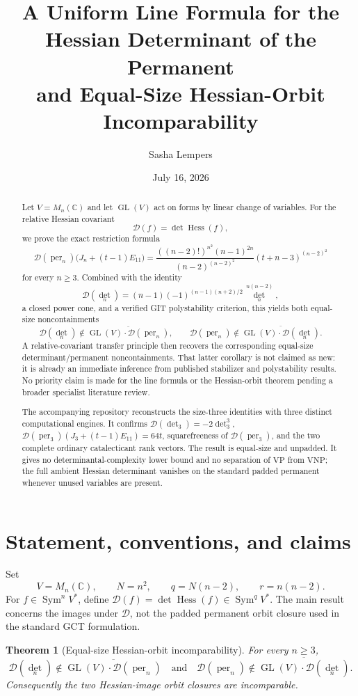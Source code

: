 \documentclass[11pt]{article}
\title{A Uniform Line Formula for the Hessian Determinant of the Permanent\\
and Equal-Size Hessian-Orbit Incomparability}
\author{Sasha Lempers}
\date{July 16, 2026}
\newtheorem{theorem}{Theorem}[section]
\theoremstyle{remark}
\DeclareMathOperator{\Hess}{Hess}
\DeclareMathOperator{\per}{per}
\DeclareMathOperator{\Sym}{Sym}
\DeclareMathOperator{\GL}{GL}
\newcommand{\C}{\mathbb C}
\newcommand{\Dcal}{\mathcal D}
\begin{document}
\maketitle

\begin{abstract}
Let $V=M_n(\C)$ and let $\GL(V)$ act on forms by linear change of variables.  For the relative Hessian covariant
\[
 \Dcal(f)=\det\Hess(f),
\]
we prove the exact restriction formula
\[
 \Dcal(\per_n)\bigl(J_n+(t-1)E_{11}\bigr)
 =\frac{((n-2)!)^{n^2}(n-1)^{2n}}{(n-2)^{(n-2)^2}}
   (t+n-3)^{(n-2)^2}
\]
for every $n\geq3$.  Combined with the identity
\[
 \Dcal(\det_n)
 =(n-1)(-1)^{(n-1)(n+2)/2}\det_n^{\,n(n-2)},
\]
a closed power cone, and a verified GIT polystability criterion, this yields both equal-size noncontainments
\[
 \Dcal(\det_n)\notin\overline{\GL(V)\cdot\Dcal(\per_n)},
 \qquad
 \Dcal(\per_n)\notin\overline{\GL(V)\cdot\Dcal(\det_n)}.
\]
A relative-covariant transfer principle then recovers the corresponding equal-size determinant/permanent noncontainments.  That latter corollary is not claimed as new: it is already an immediate inference from published stabilizer and polystability results.  No priority claim is made for the line formula or the Hessian-orbit theorem pending a broader specialist literature review.

The accompanying repository reconstructs the size-three identities with three distinct computational engines.  It confirms $\Dcal(\det_3)=-2\det_3^3$, $\Dcal(\per_3)(J_3+(t-1)E_{11})=64t$, squarefreeness of $\Dcal(\per_3)$, and the two complete ordinary catalecticant rank vectors.  The result is equal-size and unpadded.  It gives no determinantal-complexity lower bound and no separation of $\mathrm{VP}$ from $\mathrm{VNP}$; the full ambient Hessian determinant vanishes on the standard padded permanent whenever unused variables are present.
\end{abstract}

\section{Statement, conventions, and claims}
Set
\[
 V=M_n(\C),\qquad N=n^2,\qquad q=N(n-2),\qquad r=n(n-2).
\]
For $f\in\Sym^nV^*$, define $\Dcal(f)=\det\Hess(f)\in\Sym^qV^*$.  The main result concerns the images under $\Dcal$, not the padded permanent orbit closure used in the standard GCT formulation.

\begin{theorem}[Equal-size Hessian-orbit incomparability]\label{thm:main}
For every $n\geq3$,
\[
 \Dcal(\det_n)\notin\overline{\GL(V)\cdot\Dcal(\per_n)}
 \quad\text{and}\quad
 \Dcal(\per_n)\notin\overline{\GL(V)\cdot\Dcal(\det_n)}.
\]
Consequently the two Hessian-image orbit closures are incomparable.
\end{theorem}
\end{document}
